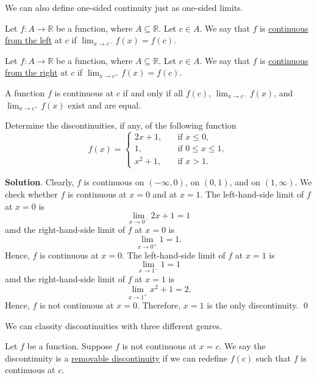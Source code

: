 \documentclass[11pt]{book}
\theoremstyle{break}
\theoremstyle{no_label}
\newcommand{\bbR}{\mathbb{R}}
\numberwithin{equation}{section}
\begin{document}
We can also define one-sided continuity just as one-sided limits.

\begin{definition}
    Let $f:A\to\bbR$ be a function, where $A\subseteq\bbR$. Let $c\in A$. We say that $f$ is \underline{continuous from the left} at $c$ if $\displaystyle\lim_{x\to c^-}f(x)=f(c)$.
\end{definition}

\begin{definition}
    Let $f:A\to\bbR$ be a function, where $A\subseteq\bbR$. Let $c\in A$. We say that $f$ is \underline{continuous from the right} at $c$ if $\displaystyle\lim_{x\to c^+}f(x)=f(c)$.
\end{definition}

\begin{theorem}
    A function $f$ is continuous at $c$ if and only if all $f(c)$, $\displaystyle\lim_{x\to c^-}f(x)$, and $\displaystyle\lim_{x\to c^+}f(x)$ exist and are equal.
\end{theorem}

\begin{example}
    Determine the discontinuities, if any, of the following function $$f(x)=\left\{\begin{array}{rl}
        2x+1,\quad & \text{if $x\leq 0$},\\
        1, \quad & \text{if $0\leq x\leq 1$},\\
        x^2+1, \quad & \text{if $x>1$}.
    \end{array}\right.$$
\end{example}
\textbf{Solution}. Clearly, $f$ is continuous on $(-\infty, 0)$, on $(0, 1)$, and on $(1, \infty)$. We check whether $f$ is continuous at $x=0$ and at $x=1$. The left-hand-side limit of $f$ at $x=0$ is $$\lim_{x\to 0^-}2x+1=1$$ amd the right-hand-side limit of $f$ at $x=0$ is $$\lim_{x\to 0^+}1=1.$$ Hence, $f$ is continuous at $x=0$. The left-hand-side limit of $f$ at $x=1$ is $$\lim_{x\to 1^-}1=1$$ amd the right-hand-side limit of $f$ at $x=1$ is $$\lim_{x\to 1^+}x^2+1=2.$$ Hence, $f$ is not continuous at $x=0$. Therefore, $x=1$ is the only discontinuity. \qed

We can classity discontinuities with three different genres.

\begin{definition}
    Let $f$ be a function. Suppose $f$ is not continuous at $x=c$. We say the discontinuity is a \underline{removable discontinuity} if we can redefine $f(c)$ such that $f$ is continuous at $c$.
\end{definition}
\end{document}
